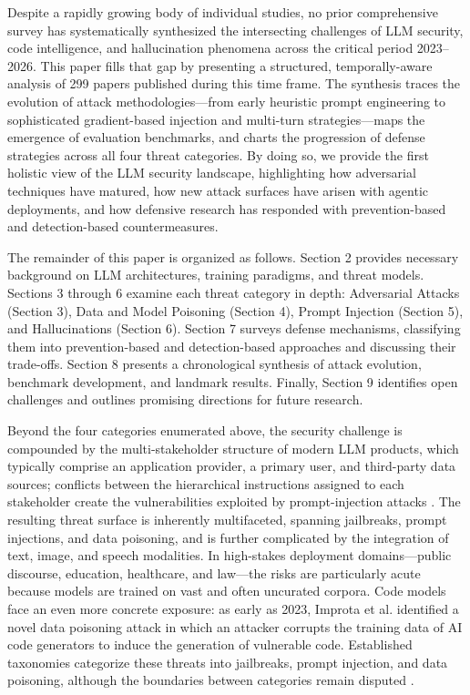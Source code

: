 \documentclass[11pt,a4paper]{article}
\begin{document}
Despite a rapidly growing body of individual studies, no prior comprehensive survey has systematically synthesized the intersecting challenges of LLM security, code intelligence, and hallucination phenomena across the critical period 2023--2026. This paper fills that gap by presenting a structured, temporally-aware analysis of 299 papers published during this time frame. The synthesis traces the evolution of attack methodologies---from early heuristic prompt engineering to sophisticated gradient-based injection and multi-turn strategies---maps the emergence of evaluation benchmarks, and charts the progression of defense strategies across all four threat categories. By doing so, we provide the first holistic view of the LLM security landscape, highlighting how adversarial techniques have matured, how new attack surfaces have arisen with agentic deployments, and how defensive research has responded with prevention-based and detection-based countermeasures.

The remainder of this paper is organized as follows. Section 2 provides necessary background on LLM architectures, training paradigms, and threat models. Sections 3 through 6 examine each threat category in depth: Adversarial Attacks (Section 3), Data and Model Poisoning (Section 4), Prompt Injection (Section 5), and Hallucinations (Section 6). Section 7 surveys defense mechanisms, classifying them into prevention-based and detection-based approaches and discussing their trade-offs. Section 8 presents a chronological synthesis of attack evolution, benchmark development, and landmark results. Finally, Section 9 identifies open challenges and outlines promising directions for future research.

Beyond the four categories enumerated above, the security challenge is compounded by the multi-stakeholder structure of modern LLM products, which typically comprise an application provider, a primary user, and third-party data sources; conflicts between the hierarchical instructions assigned to each stakeholder create the vulnerabilities exploited by prompt-injection attacks \cite{Wu_2025_LLM_7fee400f}. The resulting threat surface is inherently multifaceted, spanning jailbreaks, prompt injections, and data poisoning, and is further complicated by the integration of text, image, and speech modalities. In high-stakes deployment domains---public discourse, education, healthcare, and law---the risks are particularly acute because models are trained on vast and often uncurated corpora. Code models face an even more concrete exposure: as early as 2023, Improta et al. \cite{Improta_2023_AI_20bc1909} identified a novel data poisoning attack in which an attacker corrupts the training data of AI code generators to induce the generation of vulnerable code. Established taxonomies categorize these threats into jailbreaks, prompt injection, and data poisoning, although the boundaries between categories remain disputed \cite{Li_2025_LLM_6131fb27}.
\end{document}
